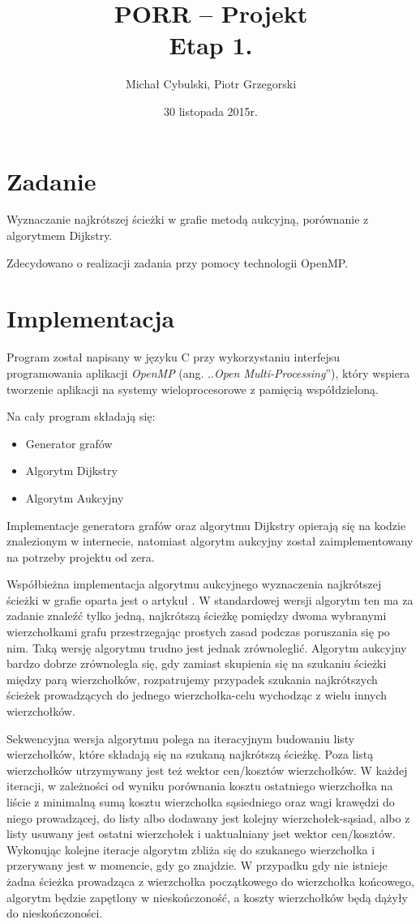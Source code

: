 \documentclass {article}
\author {Michał Cybulski, Piotr Grzegorski}
\title {PORR -- Projekt\\Etap 1.}
\date {30 listopada 2015r.}
\begin{document}
\maketitle

\section {Zadanie}

Wyznaczanie najkrótszej ścieżki w grafie metodą aukcyjną, porównanie z algorytmem Dijkstry.

Zdecydowano o realizacji zadania przy pomocy technologii OpenMP.

\section{Implementacja}

Program został napisany w języku C przy wykorzystaniu interfejsu programowania aplikacji \emph{OpenMP} (ang. ..\emph{Open Multi-Processing}''), który wspiera tworzenie aplikacji na systemy wieloprocesorowe z pamięcią współdzieloną.

Na cały program składają się:
\begin{itemize}
    \item Generator grafów
    \item Algorytm Dijkstry
    \item Algorytm Aukcyjny
\end{itemize}

Implementacje generatora grafów oraz algorytmu Dijkstry opierają się na kodzie znalezionym w internecie, natomiast algorytm aukcyjny został zaimplementowany na potrzeby projektu od zera. 

Współbieżna implementacja algorytmu aukcyjnego wyznaczenia najkrótszej ścieżki w grafie oparta jest o artykuł \cite{TODO}. W standardowej wersji algorytm ten ma za zadanie znaleźć tylko jedną, najkrótszą ścieżkę pomiędzy dwoma wybranymi wierzchołkami grafu przestrzegając prostych zasad podczas poruszania się po nim. Taką wersję algorytmu trudno jest jednak zrównoleglić. Algorytm aukcyjny bardzo dobrze zrównolegla się, gdy zamiast skupienia się na szukaniu ścieżki między parą wierzchołków, rozpatrujemy przypadek szukania najkrótszych ścieżek prowadzących do jednego wierzchołka-celu wychodząc z wielu innych wierzchołków.

Sekwencyjna wersja algorytmu polega na iteracyjnym budowaniu listy wierzchołków, które składają się na szukaną najkrótszą ścieżkę. Poza listą wierzchołków utrzymywany jest też wektor cen/kosztów wierzchołków. W każdej iteracji, w zależności od wyniku porównania kosztu ostatniego wierzchołka na liście z minimalną sumą kosztu wierzchołka sąsiedniego oraz wagi krawędzi do niego prowadzącej, do listy albo dodawany jest kolejny wierzchołek-sąsiad, albo z listy usuwany jest ostatni wierzchołek i uaktualniany jset wektor cen/kosztów. Wykonując kolejne iteracje algorytm zbliża się do szukanego wierzchołka i przerywany jest w momencie, gdy go znajdzie. W przypadku gdy nie istnieje żadna ścieżka prowadząca z wierzchołka początkowego do wierzchołka końcowego, algorytm będzie zapętlony w nieskończoność, a koszty wierzchołków będą dążyły do nieskończoności.
\end{document}

